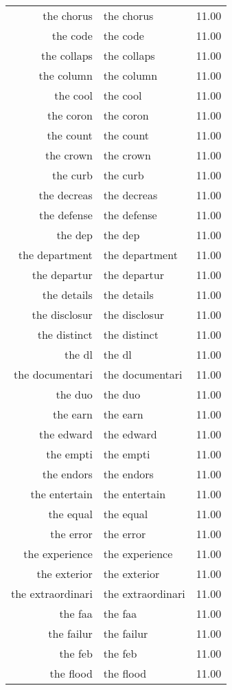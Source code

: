 \begin{table}[ht]
\begin{tabular}{rlr}
  the chorus & the chorus & 11.00 \\ 
  the code & the code & 11.00 \\ 
  the collaps & the collaps & 11.00 \\ 
  the column & the column & 11.00 \\ 
  the cool & the cool & 11.00 \\ 
  the coron & the coron & 11.00 \\ 
  the count & the count & 11.00 \\ 
  the crown & the crown & 11.00 \\ 
  the curb & the curb & 11.00 \\ 
  the decreas & the decreas & 11.00 \\ 
  the defense & the defense & 11.00 \\ 
  the dep & the dep & 11.00 \\ 
  the department & the department & 11.00 \\ 
  the departur & the departur & 11.00 \\ 
  the details & the details & 11.00 \\ 
  the disclosur & the disclosur & 11.00 \\ 
  the distinct & the distinct & 11.00 \\ 
  the dl & the dl & 11.00 \\ 
  the documentari & the documentari & 11.00 \\ 
  the duo & the duo & 11.00 \\ 
  the earn & the earn & 11.00 \\ 
  the edward & the edward & 11.00 \\ 
  the empti & the empti & 11.00 \\ 
  the endors & the endors & 11.00 \\ 
  the entertain & the entertain & 11.00 \\ 
  the equal & the equal & 11.00 \\ 
  the error & the error & 11.00 \\ 
  the experience & the experience & 11.00 \\ 
  the exterior & the exterior & 11.00 \\ 
  the extraordinari & the extraordinari & 11.00 \\ 
  the faa & the faa & 11.00 \\ 
  the failur & the failur & 11.00 \\ 
  the feb & the feb & 11.00 \\ 
  the flood & the flood & 11.00 \\ 

\end{tabular}
\end{table}
